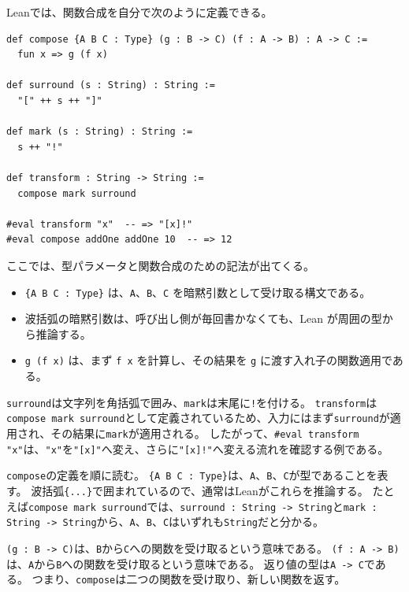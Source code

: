 Leanでは、関数合成を自分で次のように定義できる。

\begin{listing}[htbp]
\begin{verbatim}
def compose {A B C : Type} (g : B -> C) (f : A -> B) : A -> C :=
  fun x => g (f x)

def surround (s : String) : String :=
  "[" ++ s ++ "]"

def mark (s : String) : String :=
  s ++ "!"

def transform : String -> String :=
  compose mark surround

#eval transform "x"  -- => "[x]!"
#eval compose addOne addOne 10  -- => 12
\end{verbatim}
\caption{関数合成を定義する}
\label{lst:ch01-compose-definition}
\end{listing}

\begin{syntaxbox}
ここでは、型パラメータと関数合成のための記法が出てくる。
\begin{itemize}
\item \texttt{\{A B C : Type\}} は、\texttt{A}、\texttt{B}、\texttt{C} を暗黙引数として受け取る構文である。
\item 波括弧の暗黙引数は、呼び出し側が毎回書かなくても、Lean が周囲の型から推論する。
\item \texttt{g (f x)} は、まず \texttt{f x} を計算し、その結果を \texttt{g} に渡す入れ子の関数適用である。
\end{itemize}
\end{syntaxbox}

\texttt{surround}は文字列を角括弧で囲み、\texttt{mark}は末尾に\texttt{!}を付ける。
\texttt{transform}は\texttt{compose mark surround}として定義されているため、入力にはまず\texttt{surround}が適用され、その結果に\texttt{mark}が適用される。
したがって、\texttt{\#eval transform "x"}は、\texttt{"x"}を\texttt{"[x]"}へ変え、さらに\texttt{"[x]!"}へ変える流れを確認する例である。

\texttt{compose}の定義を順に読む。
\texttt{\{A B C : Type\}}は、\texttt{A}、\texttt{B}、\texttt{C}が型であることを表す。
波括弧\texttt{\{...\}}で囲まれているので、通常はLeanがこれらを推論する。
たとえば\texttt{compose mark surround}では、\texttt{surround : String -> String}と\texttt{mark : String -> String}から、\texttt{A}、\texttt{B}、\texttt{C}はいずれも\texttt{String}だと分かる。

\texttt{(g : B -> C)}は、\texttt{B}から\texttt{C}への関数を受け取るという意味である。
\texttt{(f : A -> B)}は、\texttt{A}から\texttt{B}への関数を受け取るという意味である。
返り値の型は\texttt{A -> C}である。
つまり、\texttt{compose}は二つの関数を受け取り、新しい関数を返す。

